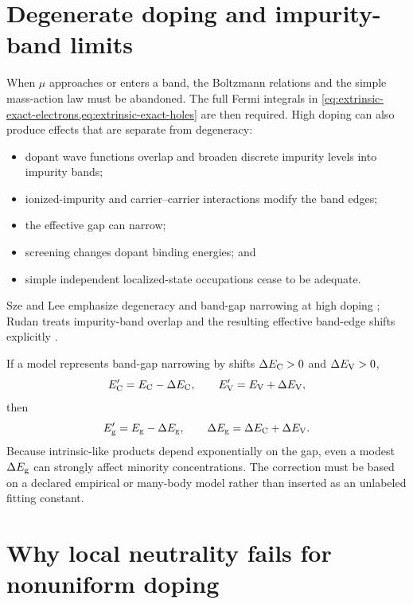 \section{Degenerate doping and impurity-band limits}

When $\mu$ approaches or enters a band, the Boltzmann relations and the simple
mass-action law must be abandoned.  The full Fermi integrals in
\cref{eq:extrinsic-exact-electrons,eq:extrinsic-exact-holes} are then required.
High doping can also produce effects that are separate from degeneracy:
\begin{itemize}
  \item dopant wave functions overlap and broaden discrete impurity levels into
        impurity bands;
  \item ionized-impurity and carrier--carrier interactions modify the band
        edges;
  \item the effective gap can narrow;
  \item screening changes dopant binding energies; and
  \item simple independent localized-state occupations cease to be adequate.
\end{itemize}
Sze and Lee emphasize degeneracy and band-gap narrowing at high doping
\cite[Sec.~1.6.2]{szeLee2012}; Rudan treats impurity-band overlap and the
resulting effective band-edge shifts explicitly
\cite[Sec.~18.6]{rudan2015}.

If a model represents band-gap narrowing by shifts
$\Delta E_{\mathrm C}>0$ and $\Delta E_{\mathrm V}>0$,
\begin{equation}
  E_{\mathrm C}'=E_{\mathrm C}-\Delta E_{\mathrm C},
  \qquad
  E_{\mathrm V}'=E_{\mathrm V}+\Delta E_{\mathrm V},
  \label{eq:band-gap-narrowing-edge-shifts}
\end{equation}
then
\begin{equation}
  E_{\mathrm g}'=E_{\mathrm g}-\Delta E_{\mathrm g},
  \qquad
  \Delta E_{\mathrm g}=\Delta E_{\mathrm C}+\Delta E_{\mathrm V}.
  \label{eq:band-gap-narrowing}
\end{equation}
Because intrinsic-like products depend exponentially on the gap, even a modest
$\Delta E_{\mathrm g}$ can strongly affect minority concentrations.  The correction must
be based on a declared empirical or many-body model rather than inserted as an
unlabeled fitting constant.

\section{Why local neutrality fails for nonuniform doping}

